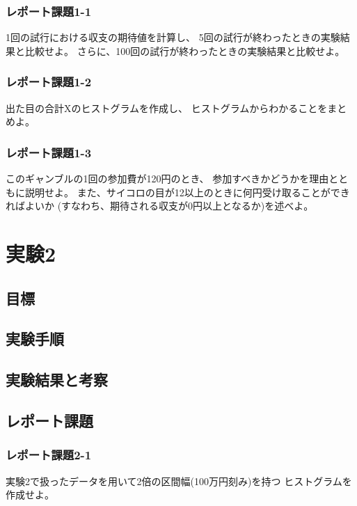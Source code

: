 \documentclass[12pt]{jarticle}
\begin{document}
\subsubsection*{レポート課題1-1}
\begin{shadebox}
    1回の試行における収支の期待値を計算し、
    5回の試行が終わったときの実験結果と比較せよ。
    さらに、100回の試行が終わったときの実験結果と比較せよ。
\end{shadebox}

\subsubsection*{レポート課題1-2}
\begin{shadebox}
    出た目の合計Xのヒストグラムを作成し、
    ヒストグラムからわかることをまとめよ。
\end{shadebox}

\subsubsection*{レポート課題1-3}
\begin{shadebox}
    このギャンブルの1回の参加費が120円のとき、
    参加すべきかどうかを理由とともに説明せよ。
    また、サイコロの目が12以上のときに何円受け取ることができればよいか
    (すなわち、期待される収支が0円以上となるか)を述べよ。
\end{shadebox}

\section{実験2}

\subsection{目標}

\subsection{実験手順}
\subsection{実験結果と考察}
\subsection{レポート課題}
\subsubsection*{レポート課題2-1}
\begin{shadebox}
    実験2で扱ったデータを用いて2倍の区間幅(100万円刻み)を持つ
    ヒストグラムを作成せよ。
\end{shadebox}
\end{document}
